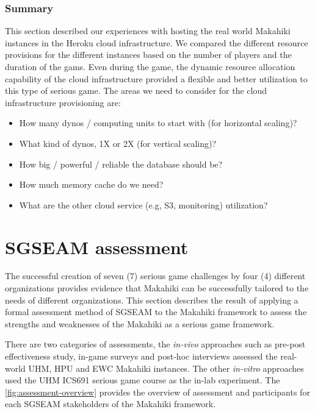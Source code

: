 \subsubsection{Summary}

This section described our experiences with hosting the real world Makahiki instances in the Heroku cloud infrastructure. We compared the different resource provisions for the different instances based on the number of players and the duration of the gams.  Even during the game, the dynamic resource allocation capability of the cloud infrastructure provided a flexible and better utilization to this type of serious game. The areas we need to consider for the cloud infrastructure provisioning are:
\begin{itemize}
\item How many dynos / computing units to start with (for horizontal scaling)?
\item What kind of dynos, 1X or 2X (for vertical scaling)? 
\item How big / powerful / reliable the database should be? 
\item How much memory cache do we need?
\item What are the other cloud service (e.g, S3, monitoring) utilization?
\end{itemize}

\section{SGSEAM assessment}

The successful creation of seven (7) serious game challenges by four (4) different organizations
provides evidence that Makahiki can be successfully tailored to the needs of different organizations. This section describes the result of applying a formal assessment method of SGSEAM to the Makahiki framework to assess the strengths and weaknesses of the Makahiki as a serious game framework.

There are two categories of assessments, the {\em in-vivo} approaches such as pre-post effectiveness study, in-game surveys and post-hoc interviews assessed the real-world UHM, HPU and EWC Makahiki instances. The other {\em in-vitro} approaches used the UHM ICS691 serious game course as the in-lab experiment.  The \autoref{fig:assessment-overview} provides the overview of assessment and participants for each SGSEAM stakeholders of the Makahiki framework. 

